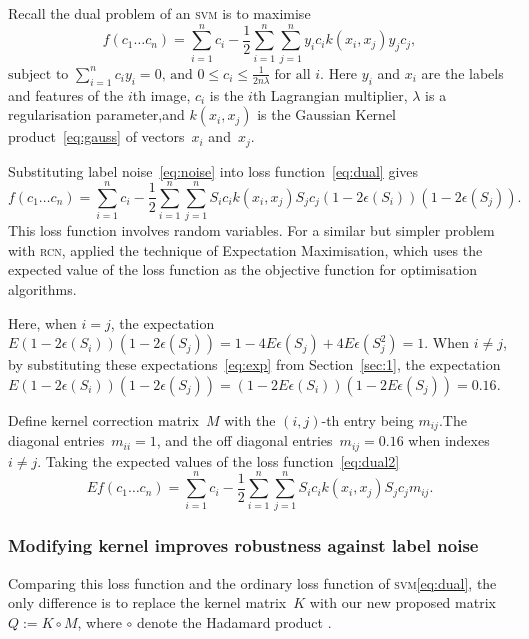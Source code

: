 \documentclass[12pt]{article} %
\newcommand{\svm}{\textsc{svm}}
\begin{document}
Recall the dual problem of an \textsc{svm} is to maximise
\begin{equation}
   f(c_{1}\ldots c_{n})=\sum _{i=1}^{n}c_{i}-{\frac {1}{2}}\sum _{i=1}^{n}\sum _{j=1}^{n}y_{i}c_{i}k(x_{i},x_{j})y_{j}c_{j}, \label{eq:dual}
\end{equation}
\begin{math}
{\text{subject to }}\sum _{i=1}^{n}c_{i}y_{i}=0,\,{\text{and }}0\leq c_{i}\leq {\frac {1}{2n\lambda }}\;{\text{for all }}i. 
\end{math} 
Here $y_i$ and $x_i$ are the labels and features of the $i$th image, $c_i$ is the $i$th Lagrangian multiplier, $\lambda$ is a regularisation parameter,and $k(x_i,x_j)$ is the Gaussian Kernel product~\eqref{eq:gauss} of vectors~$x_i$ and~$x_j$.

Substituting label noise~\eqref{eq:noise} into loss function~\eqref{eq:dual} gives
\begin{equation}
   f(c_{1}\ldots c_{n})=\sum _{i=1}^{n}c_{i}-{\frac {1}{2}}\sum _{i=1}^{n}\sum _{j=1}^{n}S_{i}c_{i}k(x_{i},x_{j})S_{j}c_{j}(1-2\epsilon(S_i))(1-2\epsilon(S_j)). \label{eq:dual2}
\end{equation}
This loss function involves random variables. For a similar  but simpler problem with \textsc{rcn}, \citet{pmlr-v20-biggio11} applied the technique of Expectation Maximisation, which uses the expected value of the loss function as the objective function for optimisation algorithms.

Here, when $i=j$, the expectation~$E(1-2\epsilon(S_i))(1-2\epsilon(S_j))=1-4E\epsilon(S_j)+4E\epsilon(S_j^2)=1$. 
When $i\neq j$, by substituting these expectations~\eqref{eq:exp} from Section~\ref{sec:1}, the expectation~$E(1-2\epsilon(S_i))(1-2\epsilon(S_j))=(1-2E\epsilon(S_i))(1-2E\epsilon(S_j))=0.16$. 

Define kernel correction matrix~$M$ with the $(i,j)$-th entry being $m_{ij}$.The diagonal entries~$m_{ii}=1 $, and the off diagonal entries~$m_{ij}=0.16$ when indexes~$i\neq j$. Taking the expected values of the loss function~\eqref{eq:dual2}
\begin{equation}
   Ef(c_{1}\ldots c_{n})=\sum _{i=1}^{n}c_{i}-{\frac {1}{2}}\sum _{i=1}^{n}\sum _{j=1}^{n}S_{i}c_{i}k(x_{i},x_{j})S_{j}c_{j}m_{ij}. \label{eq:dual3}
\end{equation}

\subsubsection{Modifying kernel improves robustness against label noise}
Comparing this loss function and the ordinary loss function of \svm \eqref{eq:dual}, the only difference is to replace the kernel matrix~$K$ with our new proposed matrix~$Q:=K\circ M$, where $\circ$ denote the Hadamard product \citep{hastie01statisticallearning}.
\end{document}
